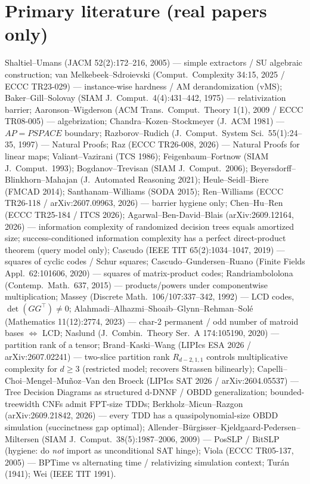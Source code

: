 \documentclass[11pt]{article}
\begin{document}
\section*{Primary literature (real papers only)}
Shaltiel--Umans (JACM 52(2):172--216, 2005) --- simple extractors / SU algebraic
construction;
van Melkebeek--Sdroievski (Comput.\ Complexity 34:15, 2025 / ECCC TR23-029) ---
instance-wise hardness / AM derandomization (vMS);
Baker--Gill--Solovay (SIAM J.\ Comput.\ 4(4):431--442, 1975) --- relativization
barrier;
Aaronson--Wigderson (ACM Trans.\ Comput.\ Theory 1(1), 2009 / ECCC TR08-005) ---
algebrization;
Chandra--Kozen--Stockmeyer (J.\ ACM 1981) --- $AP=PSPACE$ boundary;
Razborov--Rudich (J.\ Comput.\ System Sci.\ 55(1):24--35, 1997) --- Natural Proofs;
Raz (ECCC TR26-008, 2026) --- Natural Proofs for linear maps;
Valiant--Vazirani (TCS 1986); Feigenbaum--Fortnow (SIAM J.\ Comput.\ 1993);
Bogdanov--Trevisan (SIAM J.\ Comput.\ 2006);
Beyersdorff--Blinkhorn--Mahajan (J.\ Automated Reasoning 2021);
Heule--Seidl--Biere (FMCAD 2014); Santhanam--Williams (SODA 2015);
Ren--Williams (ECCC TR26-118 / arXiv:2607.09963, 2026) --- barrier hygiene only;
Chen--Hu--Ren (ECCC TR25-184 / ITCS 2026);
Agarwal--Ben-David--Blais (arXiv:2609.12164, 2026) --- information complexity of
randomized decision trees equals amortized size; success-conditioned information
complexity has a perfect direct-product theorem (query model only);
Cascudo (IEEE TIT 65(2):1034--1047, 2019) --- squares of cyclic codes / Schur squares;
Cascudo--Gundersen--Ruano (Finite Fields Appl.\ 62:101606, 2020) --- squares of
matrix-product codes;
Randriambololona (Contemp.\ Math.\ 637, 2015) --- products/powers under
componentwise multiplication;
Massey (Discrete Math.\ 106/107:337--342, 1992) --- LCD codes,
$\det(GG^\top)\neq 0$;
Alahmadi--Alhazmi--Shoaib--Glynn--Rehman--Sol\'e (Mathematics 11(12):2774, 2023)
--- char-$2$ permanent / odd number of matroid bases $\Leftrightarrow$ LCD;
Naslund (J.\ Combin.\ Theory Ser.\ A 174:105190, 2020) --- partition rank of a
tensor;
Brand--Kaski--Wang (LIPIcs ESA 2026 / arXiv:2607.02241) --- two-slice partition
rank $R_{d-2,1,1}$ controls multiplicative complexity for $d\ge 3$ (restricted
model; recovers Strassen bilinearly);
Capelli--Choi--Mengel--Mu\~noz--Van den Broeck (LIPIcs SAT 2026 /
arXiv:2604.05537) --- Tree Decision Diagrams as structured d-DNNF / OBDD
generalization; bounded-treewidth CNFs admit FPT-size TDDs;
Berkholz--Micun--Razgon (arXiv:2609.21842, 2026) --- every TDD has a
quasipolynomial-size OBDD simulation (succinctness gap optimal);
Allender--B\"urgisser--Kjeldgaard-Pedersen--Miltersen (SIAM J.\ Comput.\
38(5):1987--2006, 2009) --- PosSLP / BitSLP (hygiene: do \emph{not} import as
unconditional SAT hinge);
Viola (ECCC TR05-137, 2005) --- BPTime vs alternating time / relativizing
simulation context;
Tur\'an (1941); Wei (IEEE TIT 1991).
\end{document}
